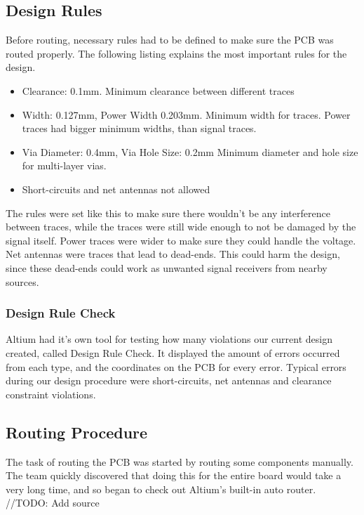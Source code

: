 \subsection{Design Rules}
Before routing, necessary rules had to be defined to make sure the PCB was routed properly. 
The following listing explains the most important rules for the design.
\begin{itemize}
\item Clearance: 0.1mm. 
\newline
Minimum clearance between different traces
\item Width: 0.127mm, Power Width 0.203mm.
\newline
Minimum width for traces. 
Power traces had bigger minimum widths, than signal traces.
\item Via Diameter: 0.4mm, Via Hole Size: 0.2mm
\newline
Minimum diameter and hole size for multi-layer vias.
\item Short-circuits and net antennas not allowed
\end{itemize}

The rules were set like this to make sure there wouldn't be any interference between traces, while the traces were still wide enough to not be damaged by the signal itself. 
Power traces were wider to make sure they could handle the voltage.
Net antennas were traces that lead to dead-ends. 
This could harm the design, since these dead-ends could work as unwanted signal receivers from nearby sources.

\subsubsection{Design Rule Check}
Altium had it's own tool for testing how many violations our current design created, called Design Rule Check. 
It displayed the amount of errors occurred from each type, and the coordinates on the PCB for every error. 
Typical errors during our design procedure were short-circuits, net antennas and clearance constraint violations.

\subsection{Routing Procedure}
The task of routing the PCB was started by routing some components manually. 
The team quickly discovered that doing this for the entire board would take a very long time, and so began to check out Altium's built-in auto router. 
//TODO: Add source

